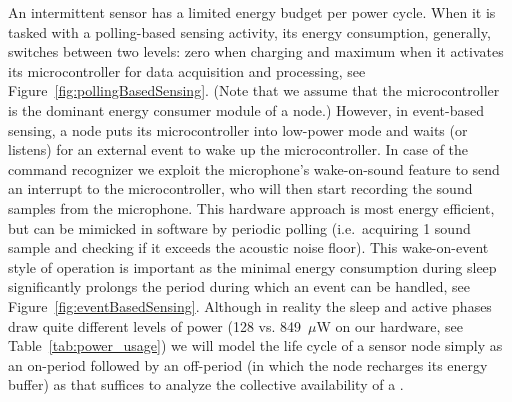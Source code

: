 %
An intermittent sensor has a limited energy budget per power cycle. When it is tasked with a polling-based sensing activity, its energy consumption, generally, switches between two levels: zero when charging and maximum when it activates its microcontroller for data acquisition and processing, see Figure~\ref{fig:pollingBasedSensing}. (Note that we assume that the microcontroller is the dominant energy consumer module of a node.) However, in event-based sensing, a node puts its microcontroller into low-power mode and waits (or listens) for an external event to wake up the microcontroller. In case of the command recognizer we exploit the microphone's wake-on-sound feature to send an interrupt to the microcontroller, who will then start recording the sound samples from the microphone. This hardware approach is most energy efficient, but can be mimicked in software by periodic polling (i.e.\ acquiring 1 sound sample and checking if it exceeds the acoustic noise floor). This wake-on-event style of operation is important as the minimal energy consumption during sleep significantly prolongs the period during which an event can be handled, see Figure~\ref{fig:eventBasedSensing}. Although in reality the sleep and active phases draw quite different levels of power (128 vs. 849~$\mu$W on our hardware, see Table~\ref{tab:power_usage}) we will model the life cycle of a sensor node simply as an on-period followed by an off-period (in which the node recharges its energy buffer) as that suffices to analyze the collective availability of a \sys.

